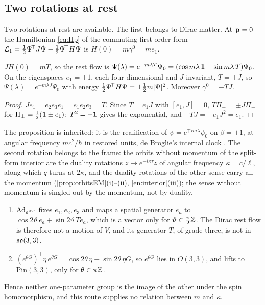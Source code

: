 \subsection{Two rotations at rest}
\label{sec:resttworot}

Two rotations at rest are available. The first belongs to Dirac matter. At $\mathbf p=0$ the Hamiltonian \eqref{eq:Hp} of the commuting
first-order form $\mathcal L_1=\tfrac12\Psi^{\!\top}J\dot\Psi-\tfrac12\Psi^{\!\top}H\Psi$ is $H(0)=m\gamma^0=me_1$.

\begin{proposition}
\label{mb:restflow}
$JH(0)=mT$, so the rest flow is $\Psi(\lambda)=e^{-m\lambda T}\Psi_0=(\cos m\lambda\,\mathbf 1-\sin m\lambda\,T)\Psi_0$. On the eigenspaces $e_1=\pm1$, each
four-dimensional and $J$-invariant, $T=\pm J$, so $\Psi(\lambda)=e^{\mp m\lambda J}\Psi_0$ with energy $\tfrac12\Psi^{\!\top}H\Psi=\pm\tfrac12 m|\Psi|^2$.
Moreover $\gamma^0=-TJ$.
\end{proposition}

\begin{proof}
$Je_1=e_2e_3e_1=e_1e_2e_3=T$. Since $T=e_1J$ with $[e_1,J]=0$, $T\Pi_\pm=\pm J\Pi_\pm$ for $\Pi_\pm=\tfrac12(\mathbf 1\pm e_1)$; $T^2=-\mathbf 1$ gives the
exponential, and $-TJ=-e_1J^2=e_1$.
\end{proof}

The proposition is inherited: it is the realification of $\psi=e^{\mp im\lambda}\psi_0$ on $\beta=\pm1$, at angular frequency $mc^2/\hbar$
in restored units, de Broglie's internal clock \cite{deBroglie1925}. The second rotation belongs to the frame: the
orbits without momentum of the split-form interior are the duality rotations $z\mapsto e^{-i\kappa\tau}z$ of angular frequency $\kappa=c/\ell$,
along which $q$ turns at $2\kappa$, and the duality rotations of the other sense carry all the momentum (\cref{prop:orbitsEM}(i)--(ii),
\cref{en:interior}(iii)); the sense without momentum is singled out by the momentum, not by duality.

\begin{proposition}
\label{cl:norel}
\begin{enumerate}[label=(\roman*),leftmargin=2.2em]
\item $\operatorname{Ad}_{e^{\vartheta T}}$ fixes $e_1,e_2,e_3$ and maps a spatial generator $e_a$ to $\cos2\vartheta\,e_a+\sin2\vartheta\,Te_a$, which is a vector
only for $\vartheta\in\tfrac\pi2\mathbb{Z}$. The Dirac rest flow is therefore not a motion of $V$, and its generator $T$, of grade three, is not in $\mathfrak{so}(3,3)$.
\item $(e^{\theta G})^{\!\top}\eta\,e^{\theta G}=\cos2\theta\,\eta+\sin2\theta\,\eta G$, so $e^{\theta G}$ lies in $O(3,3)$, and lifts to
$\mathrm{Pin}(3,3)$, only for $\theta\in\pi\mathbb{Z}$.
\end{enumerate}
Hence neither one-parameter group is the image of the other under the spin homomorphism, and this route supplies no relation between $m$
and $\kappa$.
\end{proposition}

